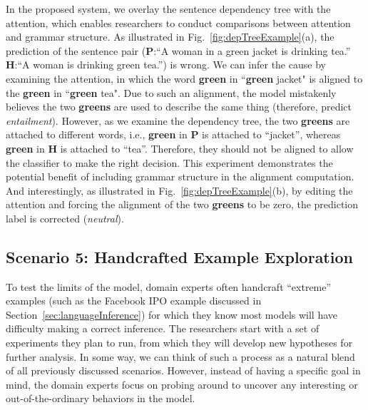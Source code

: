 In the proposed system, we overlay the sentence dependency tree with the attention, which enables researchers to conduct comparisons between attention and grammar structure.
As illustrated in Fig.~\ref{fig:depTreeExample}(a), the prediction of the sentence pair (\textbf{P}:``A woman in a green jacket is drinking tea.'' \textbf{H}:``A woman is drinking green tea.'') is wrong. We can infer the cause by examining the attention, in which the word \textbf{green} in ``\textbf{green} jacket" is aligned to the \textbf{green} in ``\textbf{green} tea". Due to such an alignment, the model mistakenly believes the two \textbf{greens} are used to describe the same thing (therefore, predict \emph{entailment}).  However, as we examine the dependency tree, the two \textbf{greens} are attached to different words, i.e., \textbf{green} in \textbf{P} is attached to ``jacket'', whereas \textbf{green} in \textbf{H} is attached to ``tea''. Therefore, they should not be aligned to allow the classifier to make the right decision.
%
This experiment demonstrates the potential benefit of including grammar structure in the alignment computation. %
%
And interestingly, as illustrated in Fig.~\ref{fig:depTreeExample}(b), by editing the attention and forcing the alignment of the two \textbf{greens} to be zero, the prediction label is corrected (\emph{neutral}).

\subsection{Scenario 5: Handcrafted Example Exploration}
To test the limits of the model, domain experts often handcraft ``extreme'' examples (such as the Facebook IPO example discussed in Section~\ref{sec:languageInference}) for which they know most models will have difficulty making a correct inference.
%
The researchers start with a set of experiments they plan to run, from which they will develop new hypotheses for further analysis.
%
In some way, we can think of such a process as a natural blend of all previously discussed scenarios. However, instead of having a specific goal in mind, the domain experts focus on probing around to uncover any interesting or out-of-the-ordinary behaviors in the model.
%


